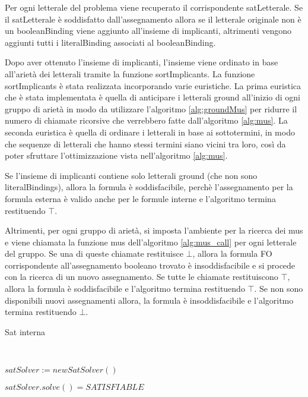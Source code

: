 \documentclass[./main.tex]{subfiles}
\begin{document}
Per ogni letterale del problema 
viene recuperato il corrispondente satLetterale.
Se il satLetterale è soddisfatto dall'assegnamento allora 
se il letterale originale non è un booleanBinding viene aggiunto all'insieme di implicanti,
altrimenti vengono aggiunti tutti i literalBinding associati al booleanBinding.

Dopo aver ottenuto l'insieme di implicanti, l'insieme viene ordinato in base all'arietà dei letterali tramite la funzione sortImplicants.
La funzione sortImplicants è stata realizzata incorporando varie euristiche.
La prima euristica che è stata implementata è quella di anticipare i letterali ground all'inizio di ogni gruppo di arietà in modo da utilizzare 
l'algoritmo \ref{alg:groundMus} per ridurre il numero di chiamate ricorsive che verrebbero fatte dall'algoritmo \ref{alg:mus}.
La seconda euristica è quella di ordinare i letterali in base ai sottotermini, in modo che sequenze di letterali
che hanno stessi termini siano vicini tra loro, così da poter sfruttare l'ottimizzazione vista nell'algoritmo \ref{alg:mus}.

Se l'insieme di implicanti contiene solo letterali ground (che non sono literalBindings), allora la formula è soddisfacibile, 
perchè l'assegnamento per la formula esterna è valido anche per le formule interne e l'algoritmo termina restituendo $\top$.

Altrimenti, per ogni gruppo di arietà, si imposta l'ambiente per la ricerca dei mus
e viene chiamata la funzione mus dell'algoritmo \ref{alg:mus_call} per ogni letterale del gruppo.
Se una di queste chiamate restituisce $\bot$, allora la formula FO corrispondente 
all'assegnamento booleano trovato è insoddisfacibile e si procede con la ricerca di un nuovo assegnamento.
Se tutte le chiamate restituiscono $\top$, allora la formula è soddisfacibile e l'algoritmo termina restituendo $\top$.
Se non sono disponibili nuovi assegnamenti allora, la formula è insoddisfacibile e l'algoritmo termina restituendo $\bot$.

\begin{algorithm}[H] \label{alg:internalSat}
    \caption{Sat interna}
    \\

$satSolver := newSatSolver()$\;

\Return $satSolver.solve() = SATISFIABLE$\;
\end{algorithm}
\end{document}
